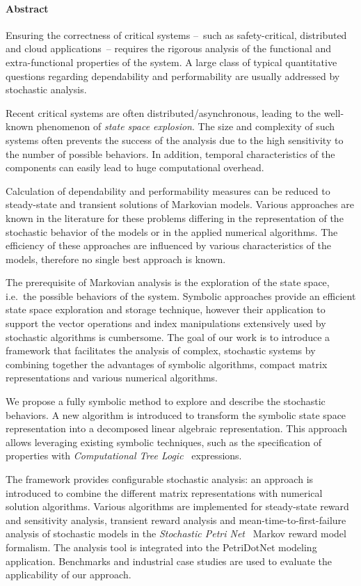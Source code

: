 \cleardoublepage

\thispagestyle{plain}
\paragraph*{Abstract}

Ensuring the correctness of critical systems --~such as
safety-critical, distributed and cloud applications~-- requires the
rigorous analysis of the functional and extra-functional properties of
the system. A large class of typical quantitative questions regarding
dependability and performability are usually addressed by stochastic
analysis.

Recent critical systems are often distributed/asynchronous, leading to
the well-known phenomenon of \emph{state space explosion}. The size
and complexity of such systems often prevents the success of the
analysis due to the high sensitivity to the number of possible
behaviors. In addition, temporal characteristics of the components can
easily lead to huge computational overhead.

Calculation of dependability and performability measures can be
reduced to steady-state and transient solutions of Markovian
models. Various approaches are known in the literature for these
problems differing in the representation of the stochastic behavior of
the models or in the applied numerical algorithms. The efficiency of
these approaches are influenced by various characteristics of the
models, therefore no single best approach is known.

The prerequisite of Markovian analysis is the exploration of the state
space, i.e.~the possible behaviors of the system. Symbolic approaches
provide an efficient state space exploration and storage technique,
however their application to support the vector operations and index
manipulations extensively used by stochastic algorithms is cumbersome.
The goal of our work is to introduce a framework that facilitates the
analysis of complex, stochastic systems by combining together the
advantages of symbolic algorithms, compact matrix representations and
various numerical algorithms.

We propose a fully symbolic method to explore and describe the
stochastic behaviors. A new algorithm is introduced to transform the
symbolic state space representation into a decomposed linear algebraic
representation. This approach allows leveraging existing symbolic
techniques, such as the specification of properties with
\emph{Computational Tree Logic}~ expressions.

The framework provides configurable stochastic analysis: an approach
is introduced to combine the different matrix representations with
numerical solution algorithms. Various algorithms are implemented for
steady-state reward and sensitivity analysis, transient reward
analysis and mean-time-to-first-failure analysis of stochastic models
in the \emph{Stochastic Petri Net}~ Markov reward
model formalism. The analysis tool is integrated into the PetriDotNet
modeling application.  Benchmarks and industrial case studies are used
to evaluate the applicability of our approach.
